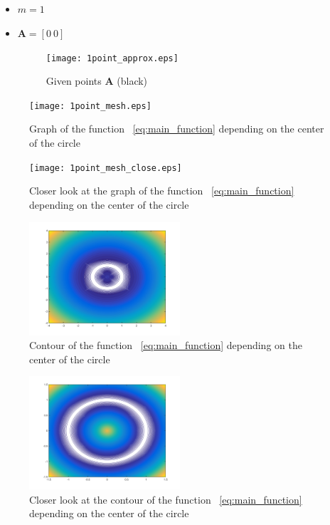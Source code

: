 \documentclass[]{scrartcl}
\begin{document}
\subsection{}\label{section_1}
 \begin{itemize}
 	\item $m = 1$ 
 	\item $ \mathbf{A} = [0 \: 0] $
 	\begin{figure}[h]
 		\centering
 		\texttt{[image: 1point\_approx.eps]}
 		\caption{Given points $\mathbf{ A} $ (black)}
 		\label{fig:m1gd}
 	\end{figure}
 \end{itemize}
\begin{figure}[h]
	\centering
	\texttt{[image: 1point\_mesh.eps]}
	\caption{Graph of the function ~\ref{eq:main_function} depending on the center of the circle}
	\label{fig:m13d}
\end{figure}
\begin{figure}[h]
	\centering
	\texttt{[image: 1point\_mesh\_close.eps]}
	\caption{Closer look at the graph of the function ~\ref{eq:main_function} depending on the center of the circle}
	\label{fig:m13dc}
\end{figure}
\begin{figure}[h]
	\centering
	\includegraphics[width=0.5\textwidth]{1point_contour.png}
	\caption{Contour of the function ~\ref{eq:main_function} depending on the center of the circle}
	\label{fig:m12d}
\end{figure}
\begin{figure}[h]
	\centering
	\includegraphics[width=0.5\textwidth]{1point_contour_close.png}
	\caption{Closer look at the contour of the function ~\ref{eq:main_function} depending on the center of the circle}
	\label{fig:m12dc}
\end{figure}
\end{document}
